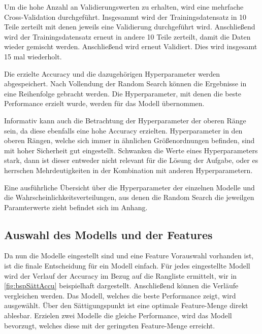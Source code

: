 Um die hohe Anzahl an Validierungswerten zu erhalten, wird eine mehrfache Cross-Validation durchgeführt. Insgesammt wird der Trainingsdatensatz in 10 Teile zerteilt mit denen jeweils eine Validierung durchgeführt wird. Anschließend wird der Trainingsdatensatz erneut in andere 10 Teile zerteilt, damit die Daten wieder gemischt werden. Anschließend wird erneut Validiert. Dies wird insgesamt 15 mal wiederholt. \par

Die erzielte Accuracy und die dazugehörigen Hyperparameter werden abgespeichert. Nach Vollendung der Random Search können die Ergebnisse in eine Reihenfolge gebracht werden. Die Hyperparameter, mit denen die beste Performance erzielt wurde, werden für das Modell übernommen. \par

Informativ kann auch die Betrachtung der Hyperparameter der oberen Ränge sein, da diese ebenfalls eine hohe Accuracy erzielten. Hyperparameter in den oberen Rängen, welche sich immer in ähnlichen Größenordnungen befinden, sind mit hoher Sicherheit gut eingestellt. Schwanken die Werte eines Hyperparameters stark, dann ist dieser entweder nicht relevant für die Lösung der Aufgabe, oder es herrschen Mehrdeutigkeiten in der Kombination mit anderen Hyperparametern. \par

Eine ausführliche Übersicht über die Hyperparameter der einzelnen Modelle und die Wahrscheinlichkeitsverteilungen, aus denen die Random Search die jeweilgen Paramterwerte zieht befindet sich im Anhang. 



\subsection{Auswahl des Modells und der Features}
Da nun die Modelle eingestellt sind und eine Feature Vorauswahl vorhanden ist, ist die finale Entscheidung für ein Modell einfach. Für jedes eingestellte Modell wird der Verlauf der Accuracy im Bezug auf die Rangliste ermittelt, wir in \ref{fig:bspSättAccu} beispielhaft dargestellt. Anschließend können die Verläufe vergleichen werden. Das Modell, welches die beste Performance zeigt, wird ausgewählt. Über den Sättigungspunkt ist eine optimale Feature-Menge direkt ablesbar. Erzielen zwei Modelle die gleiche Performance, wird das Modell bevorzugt, welches diese mit der geringsten Feature-Menge erreicht. \par

